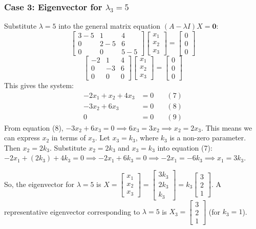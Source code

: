 \documentclass{article}
\begin{document}
\subsubsection*{Case 3: Eigenvector for $\lambda_3 = 5$}
Substitute $\lambda = 5$ into the general matrix equation $(A - \lambda I)X = \mathbf{0}$:
\[ \begin{bmatrix} 3 - 5 & 1 & 4 \\ 0 & 2 - 5 & 6 \\ 0 & 0 & 5 - 5 \end{bmatrix} \begin{bmatrix} x_1 \\ x_2 \\ x_3 \end{bmatrix} = \begin{bmatrix} 0 \\ 0 \\ 0 \end{bmatrix} \]
\[ \begin{bmatrix} -2 & 1 & 4 \\ 0 & -3 & 6 \\ 0 & 0 & 0 \end{bmatrix} \begin{bmatrix} x_1 \\ x_2 \\ x_3 \end{bmatrix} = \begin{bmatrix} 0 \\ 0 \\ 0 \end{bmatrix} \]
This gives the system:
\begin{align*} -2x_1 + x_2 + 4x_3 &= 0 \quad &(7) \\ -3x_2 + 6x_3 &= 0 \quad &(8) \\ 0 &= 0 \quad &(9) \end{align*}
From equation (8), $-3x_2 + 6x_3 = 0 \implies 6x_3 = 3x_2 \implies x_2 = 2x_3$.
This means we can express $x_2$ in terms of $x_3$. Let $x_3 = k_3$, where $k_3$ is a non-zero parameter.
Then $x_2 = 2k_3$.
Substitute $x_2 = 2k_3$ and $x_3 = k_3$ into equation (7):
$-2x_1 + (2k_3) + 4k_3 = 0 \implies -2x_1 + 6k_3 = 0 \implies -2x_1 = -6k_3 \implies x_1 = 3k_3$.

So, the eigenvector for $\lambda = 5$ is $X = \begin{bmatrix} x_1 \\ x_2 \\ x_3 \end{bmatrix} = \begin{bmatrix} 3k_3 \\ 2k_3 \\ k_3 \end{bmatrix} = k_3 \begin{bmatrix} 3 \\ 2 \\ 1 \end{bmatrix}$.
A representative eigenvector corresponding to $\lambda = 5$ is $X_3 = \begin{bmatrix} 3 \\ 2 \\ 1 \end{bmatrix}$ (for $k_3=1$).
\end{document}
